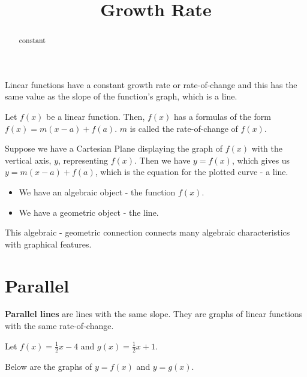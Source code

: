 \documentclass{ximera}
\title{Growth Rate}
\begin{document}
\begin{abstract}
constant
\end{abstract}
\maketitle



Linear functions have a constant growth rate or rate-of-change and this has the same value as the slope of the function's graph, which is a line.


Let $f(x)$ be a linear function.  Then, $f(x)$ has a formulas of the form $f(x) = m(x-a) + f(a)$.  $m$ is called the rate-of-change of $f(x)$.

Suppose we have a Cartesian Plane displaying the graph of $f(x)$ with the vertical axis, $y$, representing $f(x)$.  Then we have $y = f(x)$, which gives us $y = m(x-a) + f(a)$, which is the equation for the plotted curve - a line.

\begin{itemize}
\item We have an algebraic object - the function $f(x)$. 
\item We have a geometric object - the line. 
\end{itemize}


This algebraic - geometric connection connects many algebraic characteristics with graphical features.








\section{Parallel}

\textbf{Parallel lines} are lines with the same slope.  They are graphs of linear functions with the same rate-of-change.


Let $f(x) = \frac{1}{2} x - 4$ and $g(x) = \frac{1}{2} x + 1$.




Below are the graphs of $y = f(x)$ and $y = g(x)$.


\begin{image}
\end{image}
\end{document}
